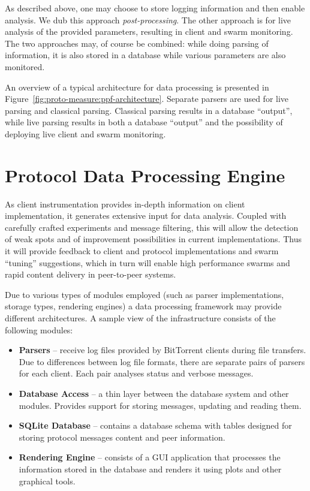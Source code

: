 As described above, one may choose to store logging information and then
enable analysis. We dub this approach \textit{post-processing}. The other
approach is for live analysis of the provided parameters, resulting in client
and swarm monitoring. The two approaches may, of course be combined: while
doing parsing of information, it is also stored in a database while various
parameters are also monitored.

An overview of a typical architecture for data processing is presented in
Figure~\ref{fig:proto-measure:ppf-architecture}. Separate parsers are used for live parsing and
classical parsing. Classical parsing results in a database ``output'', while
live parsing results in both a database ``output'' and the possibility of
deploying live client and swarm monitoring.

\section{Protocol Data Processing Engine}
\label{sec:proto-measure:data-processing}

As client instrumentation provides in-depth information on client
implementation, it generates extensive input for data analysis. Coupled
with carefully crafted experiments and message filtering, this will allow
the detection of weak spots and of improvement possibilities in current
implementations. Thus it will provide feedback to client and protocol
implementations and swarm ``tuning'' suggestions, which in turn will enable
high performance swarms and rapid content delivery in peer-to-peer systems.

Due to various types of modules employed (such as parser implementations,
storage types, rendering engines) a data processing framework may provide
different architectures. A sample view of the infrastructure consists of the
following modules:

\begin{itemize}
  \item \textbf{Parsers} -- receive log files provided by BitTorrent
clients during file transfers. Due to differences between log file formats,
there are separate pairs of parsers for each client. Each pair analyses status
and verbose messages.
  \item \textbf{Database Access} -- a thin layer between the database system and
other modules. Provides support for storing messages, updating and reading
them.
  \item \textbf{SQLite Database} -- contains a database schema with tables
designed for storing protocol messages content and peer information.
  \item \textbf{Rendering Engine} -- consists of a GUI application that
processes the information stored in the database and renders it using plots
and other graphical tools.
\end{itemize}

